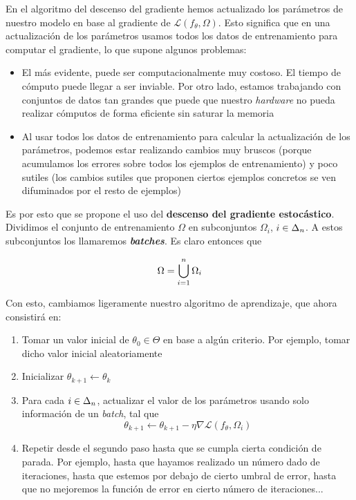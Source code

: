 En el algoritmo del descenso del gradiente hemos actualizado los parámetros de nuestro modelo en base al gradiente de $\mathcal{L}(f_{\theta}, \Omega)$. Esto significa que en una actualización de los parámetros usamos todos los datos de entrenamiento para computar el gradiente, lo que supone algunos problemas:

\begin{itemize}
    \item El más evidente, puede ser computacionalmente muy costoso. El tiempo de cómputo puede llegar a ser inviable. Por otro lado, estamos trabajando con conjuntos de datos tan grandes que puede que nuestro \textit{hardware} no pueda realizar cómputos de forma eficiente sin saturar la memoria
    \item Al usar todos los datos de entrenamiento para calcular la actualización de los parámetros, podemos estar realizando cambios muy bruscos (porque acumulamos los errores sobre todos los ejemplos de entrenamiento) y poco sutiles (los cambios sutiles que proponen ciertos ejemplos concretos se ven difuminados por el resto de ejemplos)
\end{itemize}

Es por esto que se propone el uso del \textbf{descenso del gradiente estocástico}. Dividimos el conjunto de entrenamiento $\Omega$ en subconjuntos $\Omega_i$, $i \in \Delta_{n}$. A estos subconjuntos los llamaremos \textbf{\textit{batches}}. Es claro entonces que

\begin{equation}
    \Omega = \bigcup_{i = 1}^n \Omega_i
\end{equation}

Con esto, cambiamos ligeramente nuestro algoritmo de aprendizaje, que ahora consistirá en:

\begin{enumerate}
    \item Tomar un valor inicial de $\theta_0 \in \Theta$ en base a algún criterio. Por ejemplo, tomar dicho valor inicial aleatoriamente
    \item Inicializar $\theta_{k + 1} \leftarrow \theta_k$
    \item Para cada $i \in \Delta_{n}$, actualizar el valor de los parámetros usando solo información de un \textit{batch}, tal que
        \begin{equation}
            \theta_{k + 1} \leftarrow \theta_{k + 1} - \eta \nabla \mathcal{L}(f_\theta, \Omega_i)
        \end{equation}
    \item Repetir desde el segundo paso hasta que se cumpla cierta condición de parada. Por ejemplo, hasta que hayamos realizado un número dado de iteraciones, hasta que estemos por debajo de cierto umbral de error, hasta que no mejoremos la función de error en cierto número de iteraciones...
\end{enumerate}

